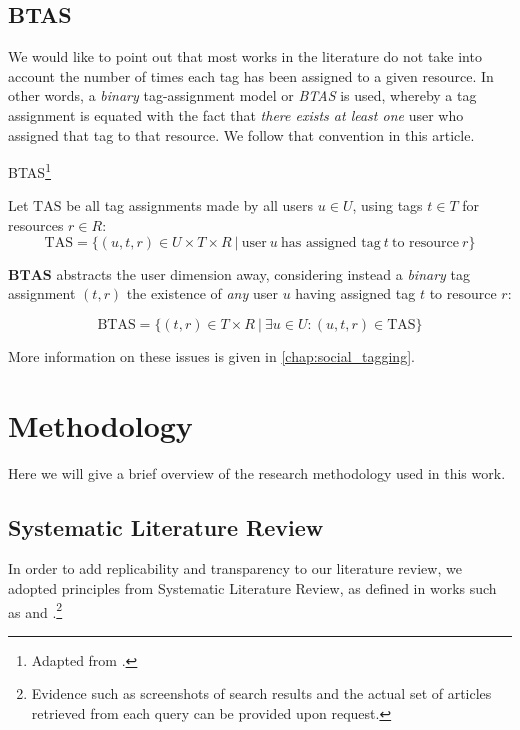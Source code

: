 \subsection{BTAS}

We would like to point out that most works in the literature do not take into account the number of times each tag has been assigned to a given resource. In other words, a \textit{binary} tag-assignment model or \textit{BTAS} \citep{illig_etal_2011} is used, whereby a tag assignment is equated with the fact that \textit{there exists at least one} user who assigned that tag to that resource. We follow that convention in this article.

\begin{definition}{BTAS}\footnote{Adapted from \cite{illig_etal_2011}.}

Let $\text{TAS}$ be all tag assignments made by all users $u \in U$, using tags $t \in T$ for resources $r \in R$:
\[ \text{TAS} = \{ (u,t,r) \in  U \times T \times R \ | \ \text{user} \ u \ \text{has assigned tag} \ t \ \text{to resource} \ r \} \]  

$\mathbf{BTAS}$ abstracts the user dimension away, considering instead a \textit{binary} tag assignment $(t,r)$ the existence of \textit{any} user $u$ having assigned tag $t$ to resource $r$:

\[ \text{BTAS} = \{(t,r) \in T \times R \ | \ \exists u \in U : (u,t,r) \in \text{TAS} \}  \]

\end{definition}

More information on these issues is given in \autoref{chap:social_tagging}.

\section{Methodology}\label{section:intro_methodology}

Here we will give a brief overview of the research methodology used in this work.

\subsection{Systematic Literature Review}\label{section:literature_review}

In order to add replicability and transparency to our literature review, we adopted principles from Systematic Literature Review, as defined in works such as \cite{baumeister_leary_1997} and \cite{bem_1995}.\footnote{Evidence such as screenshots of search results and the actual set of articles retrieved from each query can be provided upon request.}

